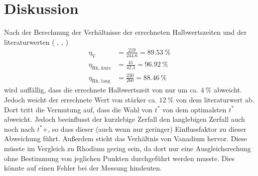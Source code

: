 \section{Diskussion}
\label{sec:Diskussion}
Nach der Berechnung der Verhältnisse der errechneten Halbwertszeiten und der literaturwerten
( \cite{rh104},  \cite{rh104i},  \cite{vana}) 
\begin{align*}
  \eta_\text{V}       &=   \frac{219}{244.6} = \SI{89.53}{\percent} \\
  \eta_\text{Rh, kurz} &=   \frac{41}{42.3}  = \SI{96.92}{\percent} \\
  \eta_\text{Rh, lang} &=   \frac{230}{260}  = \SI{88.46}{\percent} 
\end{align*}
wird auffällig, dass die errechnete Halbwertszeit von  nur um ca. $\SI{4}{\percent}$ abweicht.
Jedoch weicht der errechnete Wert von  stärker {ca. $\SI{12}{\percent}$} von dem literaturwert ab.
Dort tritt die Vermutung auf, dass die Wahl von $t^*$ von dem optimalsten $t^*$ abweicht.
Jedoch beeinflusst der kurzlebige Zerfall den langlebigen Zerfall auch noch nach $t^*$+, so dass dieser (auch wenn nur geringer) Einflussfaktor
zu dieser Abweichung führt. Außerdem sticht das Verhältnis von Vanadium hervor.
Diese müsste im Vergleich zu Rhodium gering sein, da dort nur eine Ausgleichsrechung ohne Bestimmung von jeglichen Punkten 
durchgeführt werden musste. Dies könnte auf einen Fehler bei der Messung hindeuten.